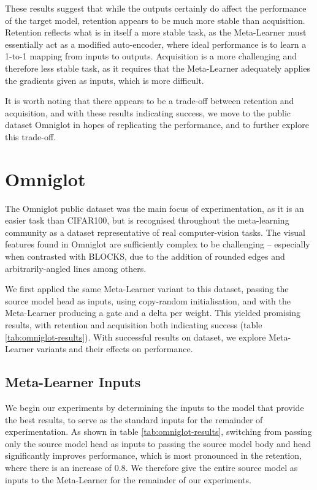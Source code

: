 \documentclass{report}
\begin{document}
These results suggest that while the outputs certainly do affect the performance of the target model, retention appears to be much more stable than acquisition. Retention reflects what is in itself a more stable task, as the Meta-Learner must essentially act as a modified auto-encoder, where ideal performance is to learn a 1-to-1 mapping from inputs to outputs. Acquisition is a more challenging and therefore less stable task, as it requires that the Meta-Learner adequately applies the gradients given as inputs, which is more difficult. \par
It is worth noting that there appears to be a trade-off between retention and acquisition, and with these results indicating success, we move to the public dataset Omniglot in hopes of replicating the performance, and to further explore this trade-off.


\section{Omniglot}
The Omniglot public dataset was the main focus of experimentation, as it is an easier task than CIFAR100, but is recognised throughout the meta-learning community as a dataset representative of real computer-vision tasks. The visual features found in Omniglot are sufficiently complex to be challenging -- especially when contrasted with BLOCKS, due to the addition of rounded edges and arbitrarily-angled lines among others. \par
We first applied the same Meta-Learner variant to this dataset, passing the source model head as inputs, using copy-random initialisation, and with the Meta-Learner producing a gate and a delta per weight. This yielded promising results, with retention and acquisition both indicating success (table \ref{tab:omniglot-results}). With successful results on dataset, we explore Meta-Learner variants and their effects on performance. \par

\subsection{Meta-Learner Inputs}
We begin our experiments by determining the inputs to the model that provide the best results, to serve as the standard inputs for the remainder of experimentation. As shown in table \ref{tab:omniglot-results}, switching from passing only the source model head as inputs to passing the source model body and head significantly improves performance, which is most pronounced in the retention, where there is an increase of $0.8$. 
We therefore give the entire source model as inputs to the Meta-Learner for the remainder of our experiments. 
\end{document}
